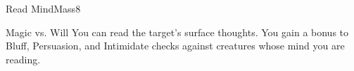 \begin{spellsection}{Read Mind}{Mass}{8}
\begin{spellheader}
\end{spellheader}
\begin{spellcontent}
    \begin{spelltargetinginfo}
    \end{spelltargetinginfo}
    \begin{spelleffects}
        \begin{spellattack}{Magic vs. Will}
            \spellsuccess You can read the target's surface thoughts. You gain a  bonus to Bluff, Persuasion, and Intimidate checks against creatures whose mind you are reading.
        \end{spellattack}
    \end{spelleffects}
\end{spellcontent}
\begin{spellfooter}
\end{spellfooter}
\end{spellsection}


